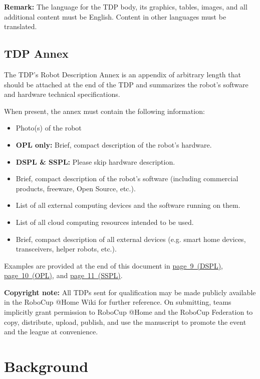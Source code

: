 \documentclass[runningheads,a4paper]{llncs}
\begin{document}
\textbf{Remark:} The language for the TDP body, its graphics, tables, images, and all additional content must be English. Content in other languages must be translated.

\subsection{TDP Annex}
The TDP's Robot Description Annex is an appendix of arbitrary length that should be attached at the end of the TDP and summarizes the robot's software and hardware technical specifications.

When present, the annex must contain the following information:

\begin{itemize}
	\item Photo(s) of the robot
	\item \textbf{OPL only:} Brief, compact description of the robot's hardware.
	\item \textbf{DSPL \& SSPL:} Please skip hardware description.
	\item Brief, compact description of the robot's software (including commercial products, freeware, Open Source, etc.).
	\item List of all external computing devices and the software running on them.
	\item List of all cloud computing resources intended to be used.
	\item Brief, compact description of all external devices (e.g. smart home devices, transceivers, helper robots, etc.).
\end{itemize}

Examples are provided at the end of this document in
\hyperlink{page.9}{page~9~(DSPL)},
\hyperlink{page.10}{page~10~(OPL)}, and
\hyperlink{page.11}{page~11~(SSPL)}.

\textbf{Copyright note:} All TDPs sent for qualification may be made publicly available in the RoboCup @Home Wiki for further reference. On submitting, teams implicitly grant permission to RoboCup @Home and the RoboCup Federation to copy, distribute, upload, publish, and use the manuscript to promote the event and the league at convenience.

\section{Background}
\lipsum[1-3]
\end{document}
